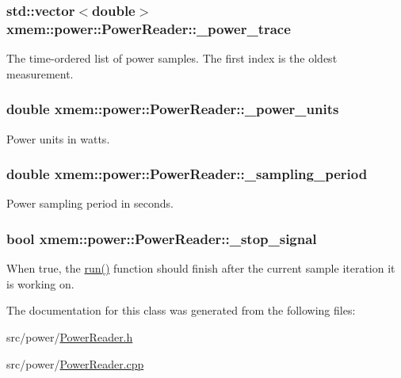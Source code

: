 \subsubsection[{\+\_\+power\+\_\+trace}]{\setlength{\rightskip}{0pt plus 5cm}std\+::vector$<$double$>$ xmem\+::power\+::\+Power\+Reader\+::\+\_\+power\+\_\+trace\hspace{0.3cm}{\ttfamily [protected]}}\label{classxmem_1_1power_1_1_power_reader_ac8ad4bada42912ece1cbb0769dbe3b4d}
The time-\/ordered list of power samples. The first index is the oldest measurement. \hypertarget{classxmem_1_1power_1_1_power_reader_a2835c933bd4807d6b3133a521dd76641}{}
\subsubsection[{\+\_\+power\+\_\+units}]{\setlength{\rightskip}{0pt plus 5cm}double xmem\+::power\+::\+Power\+Reader\+::\+\_\+power\+\_\+units\hspace{0.3cm}{\ttfamily [protected]}}\label{classxmem_1_1power_1_1_power_reader_a2835c933bd4807d6b3133a521dd76641}
Power units in watts. \hypertarget{classxmem_1_1power_1_1_power_reader_a1c7d9b505d3c94347c43437a568e5948}{}
\subsubsection[{\+\_\+sampling\+\_\+period}]{\setlength{\rightskip}{0pt plus 5cm}double xmem\+::power\+::\+Power\+Reader\+::\+\_\+sampling\+\_\+period\hspace{0.3cm}{\ttfamily [protected]}}\label{classxmem_1_1power_1_1_power_reader_a1c7d9b505d3c94347c43437a568e5948}
Power sampling period in seconds. \hypertarget{classxmem_1_1power_1_1_power_reader_a1c0c890279f3f2b7eb41ab3e5889bf2e}{}
\subsubsection[{\+\_\+stop\+\_\+signal}]{\setlength{\rightskip}{0pt plus 5cm}bool xmem\+::power\+::\+Power\+Reader\+::\+\_\+stop\+\_\+signal\hspace{0.3cm}{\ttfamily [protected]}}\label{classxmem_1_1power_1_1_power_reader_a1c0c890279f3f2b7eb41ab3e5889bf2e}
When true, the \hyperlink{classxmem_1_1power_1_1_power_reader_ad8286b3727efbcb0ff5049c6594d126a}{run()} function should finish after the current sample iteration it is working on. 

The documentation for this class was generated from the following files\+:\begin{DoxyCompactItemize}
\item 
src/power/\hyperlink{_power_reader_8h}{Power\+Reader.\+h}\item 
src/power/\hyperlink{_power_reader_8cpp}{Power\+Reader.\+cpp}\end{DoxyCompactItemize}
